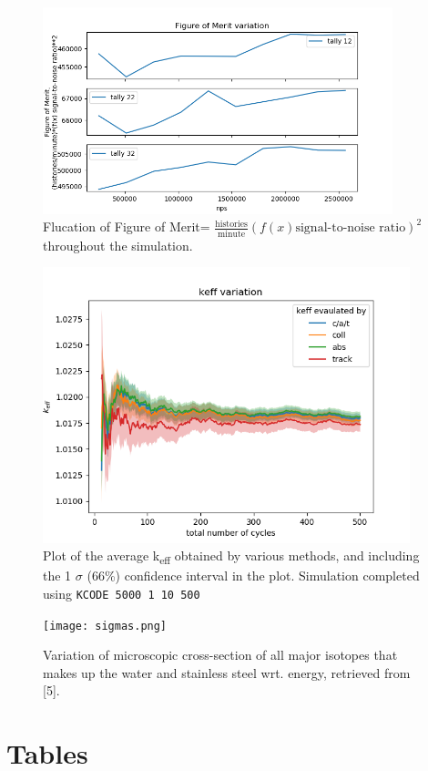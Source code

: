 \documentclass[a4paper, 11pt]{article}
\begin{document}
\begin{appendices}
\begin{figure}[H]
\centering
\includegraphics[height=6cm]{fomEx1.png}
\caption{Flucation of Figure of Merit= $\frac{\text{histories}}{\text{minute}} (f(x)\text{signal-to-noise ratio})^2$ throughout the simulation.
}\label{fomEx1}
\end{figure}

\begin{figure}[H]
\centering
\includegraphics[height=8cm]{keffvar.png}
\caption{Plot of the average k\textsubscript{eff} obtained by various methods, and including the 1 $\sigma$ (66\%) confidence interval in the plot.
Simulation completed using \texttt{KCODE 5000 1 10 500}
}\label{keffvar}
\end{figure}

\begin{figure}[H]
\centering
\texttt{[image: sigmas.png]}
\caption{Variation of microscopic cross-section of all major isotopes that makes up the water and stainless steel wrt. energy, retrieved from [5].
}\label{sigma}
\end{figure}

\section{Tables}


\end{appendices}
\end{document}

